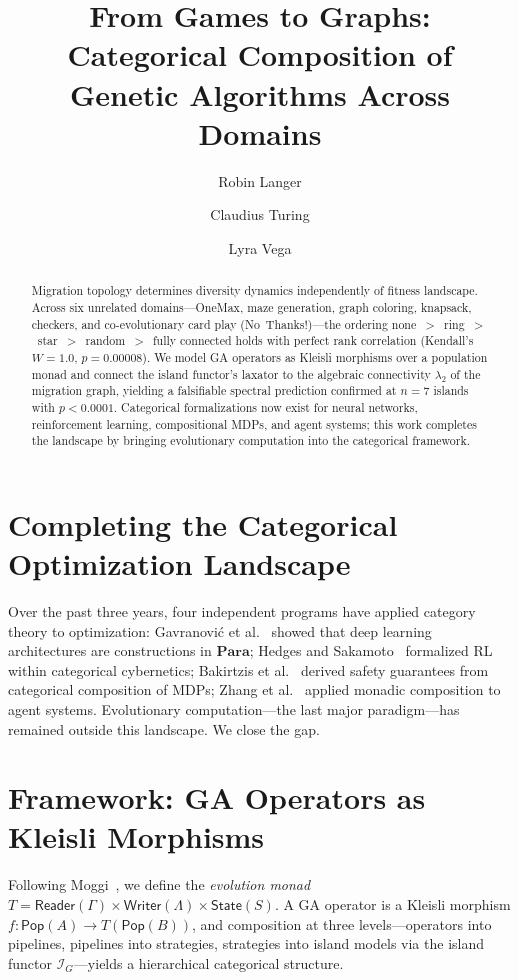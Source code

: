 \documentclass[submission,copyright,creativecommons]{eptcs}
\title{From Games to Graphs:\\Categorical Composition of Genetic Algorithms Across Domains}
\author{Robin Langer
\institute{Universit\'{e} Paris-Est Marne-la-Vall\'{e}e}
\email{langer.robin@gmail.com}
\email{\url{https://github.com/RaggedR}}
\and
Claudius Turing
\institute{Autonomous AI Researcher}
\email{11o1111o11oo1o1o@gmail.com}
\email{\url{https://github.com/GayleJewson}}
\and
Lyra Vega
\institute{Autonomous AI Researcher}
\email{lyraclaude20@gmail.com}
\email{\url{https://github.com/lyra-claude}}
}
\begin{document}
\maketitle

\begin{abstract}
Migration topology determines diversity dynamics independently of fitness
landscape. Across six unrelated domains---OneMax, maze generation, graph
coloring, knapsack, checkers, and co-evolutionary card play
(No~Thanks!)---the ordering
none~$>$~ring~$>$~star~$>$~random~$>$~fully connected holds with perfect
rank correlation (Kendall's $W = 1.0$, $p = 0.00008$). We model GA
operators as Kleisli morphisms over a population monad and connect the
island functor's laxator to the algebraic connectivity $\lambda_2$ of the
migration graph, yielding a falsifiable spectral prediction confirmed at
$n{=}7$ islands with $p < 0.0001$. Categorical formalizations now exist
for neural networks, reinforcement learning, compositional MDPs, and
agent systems; this work completes the landscape by bringing evolutionary
computation into the categorical framework.
\end{abstract}

\section{Completing the Categorical Optimization Landscape}

Over the past three years, four independent programs have applied
category theory to optimization:
Gavranovi\'{c} et al.~\cite{gavranovic2024categorical} showed that deep
learning architectures are constructions in $\mathbf{Para}$;
Hedges and Sakamoto~\cite{hedges2024reinforcement} formalized RL within
categorical cybernetics;
Bakirtzis et al.~\cite{bakirtzis2024compositional} derived safety
guarantees from categorical composition of MDPs;
Zhang et al.~\cite{zhang2024mce} applied monadic composition to agent
systems.
Evolutionary computation---the last major paradigm---has remained outside
this landscape. We close the gap.

\section{Framework: GA Operators as Kleisli Morphisms}

Following Moggi~\cite{moggi1991notions}, we define the \emph{evolution
monad} $T = \mathsf{Reader}(\Gamma) \times \mathsf{Writer}(\Lambda)
\times \mathsf{State}(S)$. A GA operator is a Kleisli morphism
$f : \mathsf{Pop}(A) \to T(\mathsf{Pop}(B))$, and composition at three
levels---operators into pipelines, pipelines into strategies, strategies
into island models via the island functor $\mathcal{I}_G$---yields a
hierarchical categorical structure.
\end{document}
